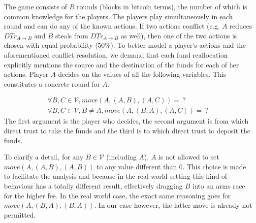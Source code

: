   The game consists of $R$ rounds (blocks in bitcoin terms), the number of which is common knowledge for the players. The
  players play simultaneously in each round and can do any of the known actions. If two actions conflict (e.g. $A$ reduces
  $DTr_{A \rightarrow B}$ and $B$ steals from $DTr_{A \rightarrow B}$ as well), then one of the two actions is chosen with
  equal probability ($50\%$). To better model a player's actions and the aforementioned conflict resolution, we demand that
  each fund reallocation explicitly mentions the source and the destination of the funds for each of her actions. Player $A$
  decides on the values of all the following variables. This constitutes a concrete round for $A$.
  
  \begin{gather*}
    \forall B, C \in \mathcal{V}, move\left(A, \left(A, B\right), \left(A, C\right) \right) = \: ? \\
    \forall B, C \in \mathcal{V}, B \neq A, move\left(A, \left(B, A\right), \left(A, C\right) \right) = \: ?
  \end{gather*}
  The first argument is the player who decides, the second argument is from which direct trust to take the funds and the third
  is to which direct trust to deposit the funds.
  
  To clarify a detail, for any $B \in \mathcal{V}$ (including $A$), $A$ is not allowed to set $move\left(A, \left(A, B\right),
  \left(A, B\right) \right)$ to any value different than 0. This choice is made to facilitate the analysis and because in the
  real-world setting this kind of behaviour has a totally different result, effectively dragging $B$ into an arms race for the
  higher fee. In the real world case, the exact same reasoning goes for $move\left(A, \left(B, A\right), \left(B, A\right)
  \right)$. In our case however, the latter move is already not permitted.
  
